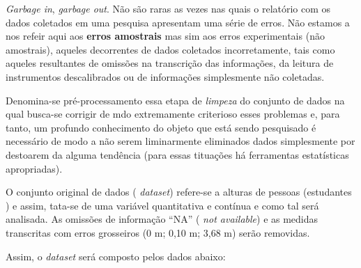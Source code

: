 \documentclass[
]{book}
\begin{document}
\hfill\break
\emph{Garbage in}, \emph{garbage out}. Não são raras as vezes nas quais o relatório com os dados coletados em uma pesquisa apresentam uma série de erros. Não estamos a nos refeir aqui aos \textbf{erros amostrais} mas sim aos erros experimentais (não amostrais), aqueles decorrentes de dados coletados incorretamente, tais como aqueles resultantes de omissões na transcrição das informações, da leitura de instrumentos descalibrados ou de informações simplesmente não coletadas.

\hfill\break

Denomina-se pré-processamento essa etapa de \emph{limpeza} do conjunto de dados na qual busca-se corrigir de mdo extremamente criterioso esses problemas e, para tanto, um profundo conhecimento do objeto que está sendo pesquisado é necessário de modo a não serem liminarmente eliminados dados simplesmente por destoarem da alguma tendência (para essas tituações há ferramentas estatísticas apropriadas).\\

\hfill\break

O conjunto original de dados ( \emph{dataset}) refere-se a alturas de pessoas (estudantes ) e assim, tata-se de uma variável quantitativa e contínua e como tal será analisada. As omissões de informação ``NA'' ( \emph{not available}) e as medidas transcritas com erros grosseiros (0 m; 0,10 m; 3,68 m) serão removidas.

\hfill\break

Assim, o \emph{dataset} será composto pelos dados abaixo:

\hfill\break
\end{document}

